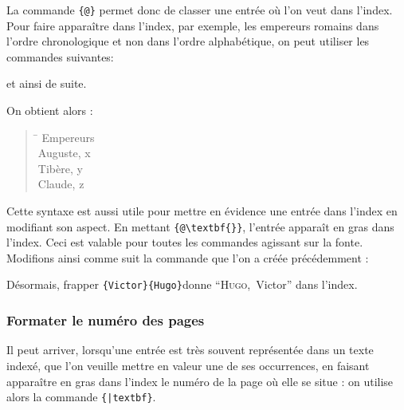 La commande \verb|{|\verb|@|\verb+}+ permet donc de classer une entrée où l'on veut dans l'index. Pour faire apparaître dans l'index, par exemple, les empereurs romains dans l'ordre chronologique et non dans l'ordre alphabétique, on peut utiliser les commandes suivantes:

\begin{latexcode}
et ainsi de suite. 
\end{latexcode}

On obtient alors :

\begin{quotation}
\begin{tabbing}
\hspace{0,5cm} \= \kill
Empereurs\\
\> Auguste, x\\
\> Tibère, y\\
\> Claude, z \\
\end{tabbing}
\end{quotation}

Cette syntaxe est aussi utile pour mettre en évidence une entrée dans l'index en modifiant son aspect. En mettant \verb|{|\verb|@\textbf{|\verb|}}|, l'entrée apparaît en gras dans l'index. Ceci est valable pour toutes les commandes agissant sur la fonte. Modifions ainsi comme suit la commande  que l'on a créée précédemment :

\begin{latexcode}
\newcommand\auteur[2]{#1~\textsc{#2}\index{#2 #1@\textsc{#2}, #1}\xspace}
\end{latexcode}

Désormais, frapper \verb|{Victor}{Hugo}|donne
 \enquote{\textsc{Hugo},~Victor} dans l'index.
 
 

\subsubsection{Formater le numéro des pages}

Il peut arriver, lorsqu'une entrée est très souvent représentée dans un texte indexé, que l'on veuille mettre en valeur une de ses occurrences, en faisant apparaître en gras dans l'index le numéro de la page où elle se situe : on utilise alors la commande \verb|{|\verb+|textbf}+. 


